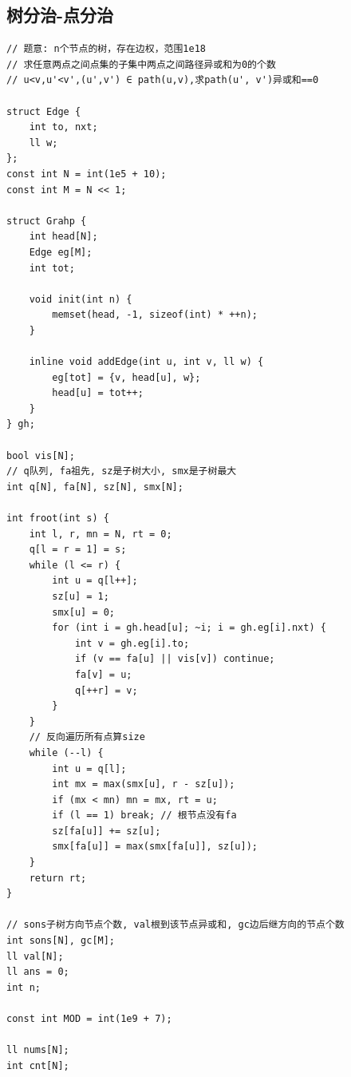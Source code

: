 \documentclass[twoside]{article}
\begin{document}
\subsection{树分治-点分治}
\begin{lstlisting}
// 题意: n个节点的树，存在边权，范围1e18
// 求任意两点之间点集的子集中两点之间路径异或和为0的个数
// u<v,u'<v',(u',v') ∈ path(u,v),求path(u', v')异或和==0

struct Edge {
    int to, nxt;
    ll w;
};
const int N = int(1e5 + 10);
const int M = N << 1;

struct Grahp {
    int head[N];
    Edge eg[M];
    int tot;

    void init(int n) {
        memset(head, -1, sizeof(int) * ++n);
    }

    inline void addEdge(int u, int v, ll w) {
        eg[tot] = {v, head[u], w};
        head[u] = tot++;
    }
} gh;

bool vis[N];
// q队列, fa祖先, sz是子树大小, smx是子树最大
int q[N], fa[N], sz[N], smx[N];

int froot(int s) {
    int l, r, mn = N, rt = 0;
    q[l = r = 1] = s;
    while (l <= r) {
        int u = q[l++];
        sz[u] = 1;
        smx[u] = 0;
        for (int i = gh.head[u]; ~i; i = gh.eg[i].nxt) {
            int v = gh.eg[i].to;
            if (v == fa[u] || vis[v]) continue;
            fa[v] = u;
            q[++r] = v;
        }
    }
    // 反向遍历所有点算size
    while (--l) {
        int u = q[l];
        int mx = max(smx[u], r - sz[u]);
        if (mx < mn) mn = mx, rt = u;
        if (l == 1) break; // 根节点没有fa
        sz[fa[u]] += sz[u];
        smx[fa[u]] = max(smx[fa[u]], sz[u]);
    }
    return rt;
}

// sons子树方向节点个数, val根到该节点异或和, gc边后继方向的节点个数
int sons[N], gc[M];
ll val[N];
ll ans = 0;
int n;

const int MOD = int(1e9 + 7);

ll nums[N];
int cnt[N];


\end{lstlisting}
\end{document}
